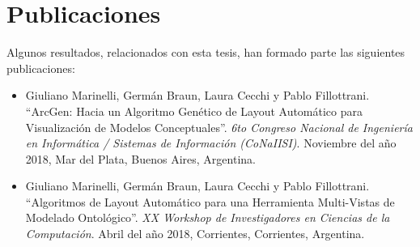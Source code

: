 \section{Publicaciones}
Algunos resultados, relacionados con esta tesis, han formado parte las siguientes publicaciones:
\begin{itemize}
\item Giuliano Marinelli, Germán Braun, Laura Cecchi y Pablo Fillottrani. ``ArcGen: Hacia un Algoritmo Genético de Layout Automático para Visualización de Modelos Conceptuales''. \emph{6to Congreso Nacional de Ingeniería en Informática / Sistemas de Información (CoNaIISI)}. Noviembre del año 2018, Mar del Plata, Buenos Aires, Argentina.
\item Giuliano Marinelli, Germán Braun, Laura Cecchi y Pablo Fillottrani. ``Algoritmos de Layout Automático para una Herramienta Multi-Vistas de Modelado Ontológico''. \emph{XX Workshop de Investigadores en Ciencias de la Computación}. Abril del año 2018, Corrientes, Corrientes, Argentina.
\end{itemize}